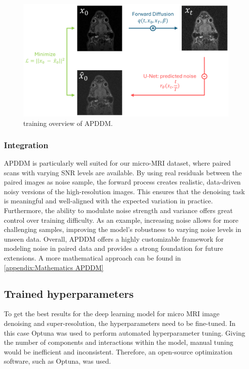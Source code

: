 \documentclass[twocolumn]{article}
\begin{document}
\begin{figure}[H]
    \centering
    \includegraphics[width=1\linewidth]{full APDDM .png}
    \caption{training overview of APDDM.}
    \label{fig:APDDM}
\end{figure}

\subsubsection{Integration}
APDDM is particularly well suited for our micro-MRI dataset, where paired scans with varying SNR levels are available. 
By using real residuals between the paired images as noise sample, the forward process creates realistic, data-driven noisy versions of the high-resolution images. 
This ensures that the denoising task is meaningful and well-aligned with the expected variation in practice. 
Furthermore, the ability to modulate noise strength and variance offers great control over training difficulty. 
As an example, increasing noise allows for more challenging samples, improving the model's robustness to varying noise levels in unseen data. 
Overall, APDDM offers a highly customizable framework for modeling noise in paired data and provides a strong foundation for future extensions. 
A more mathematical approach can be found in \ref{appendix:Mathematics APDDM}

\subsection{Trained hyperparameters}

To get the best results for the deep learning model for micro MRI image denoising and super-resolution, the hyperparameters need to be fine-tuned. 
In this case Optuna was used to perform automated hyperparameter tuning. 
Giving the number of components and interactions within the model, manual tuning would be inefficient and inconsistent. 
Therefore, an open-source optimization software, such as Optuna, was used. 
\end{document}
